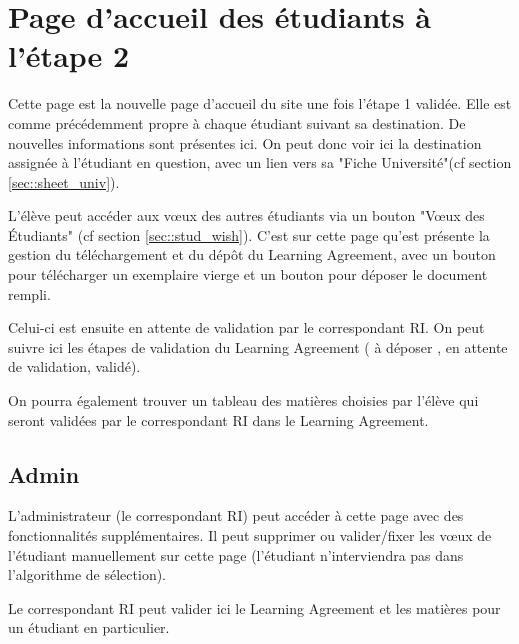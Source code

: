 \section{Page d'accueil des étudiants à l'étape 2}

Cette page est la nouvelle page d'accueil du site une fois l'étape 1 validée.
Elle est comme précédemment propre à chaque étudiant suivant sa destination. De nouvelles informations sont présentes ici.
On peut donc voir ici la destination assignée à l'étudiant en question, avec un lien vers sa "Fiche Université"(cf section \ref{sec::sheet_univ}).

L'élève peut accéder aux vœux des autres étudiants via un bouton "Vœux des Étudiants" (cf section \ref{sec::stud_wish}).
C'est sur cette page qu'est présente la gestion du téléchargement et du dépôt du Learning Agreement, avec un bouton pour télécharger un exemplaire vierge et un bouton pour déposer le document rempli.

Celui-ci est ensuite en attente de validation par le correspondant RI. On peut suivre ici les étapes de validation du Learning Agreement ( \og à déposer\fg{} , \og en attente de validation\fg{}, \og validé\fg{}).

\bigbreak

On pourra également trouver un tableau des matières choisies par l'élève qui seront validées par le correspondant RI dans le Learning Agreement.

\subsection{Admin}

L'administrateur (le correspondant RI) peut accéder à cette page avec des fonctionnalités supplémentaires.
Il peut supprimer ou valider/fixer les vœux de l'étudiant manuellement sur cette page (l'étudiant n'interviendra pas dans l'algorithme de sélection).

Le correspondant RI peut valider ici le Learning Agreement et les matières pour un étudiant en particulier.